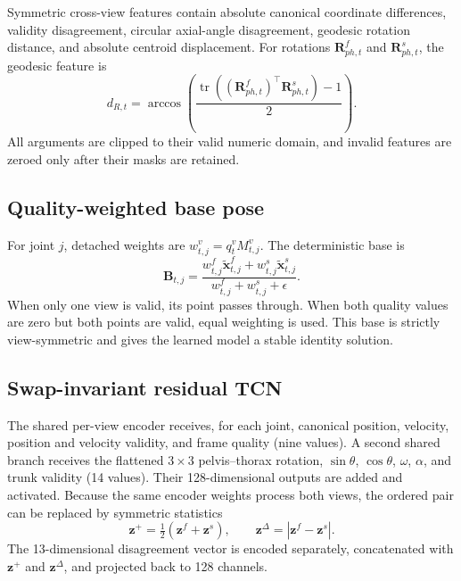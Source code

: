 Symmetric cross-view features contain absolute canonical coordinate
differences, validity disagreement, circular axial-angle disagreement,
geodesic rotation distance, and absolute centroid displacement. For rotations
$\mathbf{R}^{f}_{ph,t}$ and $\mathbf{R}^{s}_{ph,t}$, the geodesic feature is
\begin{equation}
 d_{R,t}=\arccos\left(
 \frac{\operatorname{tr}((\mathbf{R}^{f}_{ph,t})^{\top}
 \mathbf{R}^{s}_{ph,t})-1}{2}\right).
\end{equation}
All arguments are clipped to their valid numeric domain, and invalid features
are zeroed only after their masks are retained.

\subsection{Quality-weighted base pose}

For joint $j$, detached weights are
$w^v_{t,j}=q^v_t M^v_{t,j}$. The deterministic base is
\begin{equation}
 \mathbf{B}_{t,j}=
 \frac{w^f_{t,j}\widetilde{\mathbf{x}}^f_{t,j}+
       w^s_{t,j}\widetilde{\mathbf{x}}^s_{t,j}}
      {w^f_{t,j}+w^s_{t,j}+\epsilon}.
 \label{eq:base}
\end{equation}
When only one view is valid, its point passes through. When both quality values
are zero but both points are valid, equal weighting is used. This base is
strictly view-symmetric and gives the learned model a stable identity solution.

\subsection{Swap-invariant residual TCN}

The shared per-view encoder receives, for each joint, canonical position,
velocity, position and velocity validity, and frame quality (nine values). A
second shared branch receives the flattened $3\times3$ pelvis--thorax rotation,
$\sin\theta$, $\cos\theta$, $\omega$, $\alpha$, and trunk validity (14 values).
Their 128-dimensional outputs are added and activated. Because the same encoder
weights process both views, the ordered pair can be replaced by symmetric
statistics
\begin{equation}
 \mathbf{z}^{+}=\tfrac{1}{2}(\mathbf{z}^{f}+\mathbf{z}^{s}),
 \qquad
 \mathbf{z}^{\Delta}=|\mathbf{z}^{f}-\mathbf{z}^{s}|.
\end{equation}
The 13-dimensional disagreement vector is encoded separately, concatenated with
$\mathbf{z}^{+}$ and $\mathbf{z}^{\Delta}$, and projected back to 128 channels.

